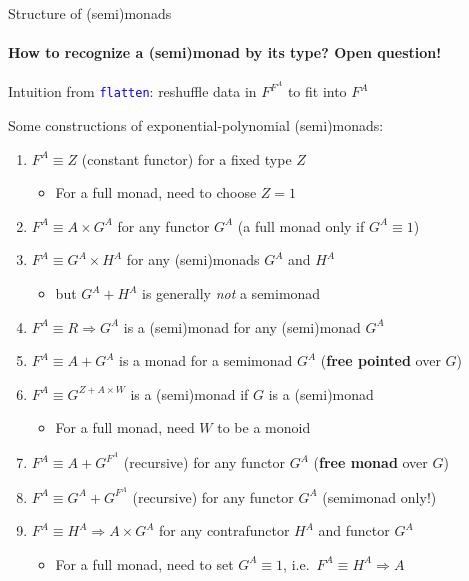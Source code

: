 \documentclass[english]{beamer}
\begin{document}
\begin{frame}{Structure of (semi)monads}


\framesubtitle{How to recognize a (semi)monad by its type? Open question!}

Intuition from \texttt{\textcolor{blue}{\footnotesize{}flatten}}:
reshuffle data in $F^{F^{A}}$ to fit into $F^{A}$

Some constructions of exponential-polynomial (semi)monads:
\begin{enumerate}
\item $F^{A}\equiv Z$ (constant functor) for a fixed type $Z$
\begin{itemize}
\item For a full monad, need to choose $Z=1$ 
\end{itemize}
\item $F^{A}\equiv A\times G^{A}$ for any functor $G^{A}$ (a full monad
only if $G^{A}\equiv1$)
\item $F^{A}\equiv G^{A}\times H^{A}$ for any (semi)monads $G^{A}$ and
$H^{A}$
\begin{itemize}
\item but $G^{A}+H^{A}$ is generally \emph{not} a semimonad
\end{itemize}
\item $F^{A}\equiv R\Rightarrow G^{A}$ is a (semi)monad for any (semi)monad
$G^{A}$
\item $F^{A}\equiv A+G^{A}$ is a monad for a semimonad $G^{A}$ (\textbf{free
pointed} over $G$)
\item $F^{A}\equiv G^{Z+A\times W}$ is a (semi)monad if $G$ is a (semi)monad
\begin{itemize}
\item For a full monad, need $W$ to be a monoid
\end{itemize}
\item $F^{A}\equiv A+G^{F^{A}}$ (recursive) for any functor $G^{A}$ (\textbf{free
monad} over $G$)
\item $F^{A}\equiv G^{A}+G^{F^{A}}$ (recursive) for any functor $G^{A}$
(semimonad only!)
\item $F^{A}\equiv H^{A}\Rightarrow A\times G^{A}$ for any contrafunctor
$H^{A}$ and functor $G^{A}$
\begin{itemize}
\item For a full monad, need to set $G^{A}\equiv1$, i.e.\ $F^{A}\equiv H^{A}\Rightarrow A$
\end{itemize}
\end{enumerate}
\end{frame}
\end{document}
